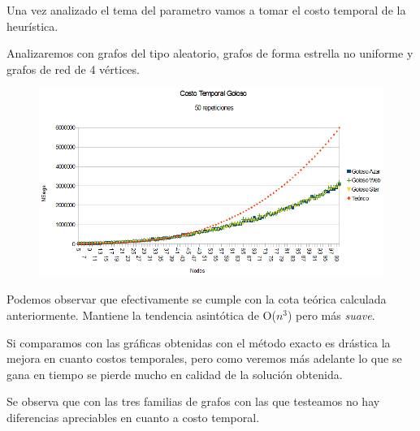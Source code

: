 \quad Una vez analizado el tema del parametro vamos a tomar el costo temporal de la heurística.

\quad Analizaremos con grafos del tipo aleatorio, grafos de forma estrella no uniforme y grafos de red de 4 vértices.

\begin{figure}[H]
	\centering
	\includegraphics[scale=0.6]{timingGoloso.png}
\end{figure}

\quad

\quad Podemos observar que efectivamente se cumple con la cota teórica calculada anteriormente. Mantiene la tendencia asintótica de O($ n^{3}$) pero más \textit{suave}. 

\quad Si comparamos con las gráficas obtenidas con el método exacto es drástica la mejora en cuanto costos temporales, pero como veremos más adelante lo que se gana en tiempo se pierde mucho en calidad de la solución obtenida.

\quad Se observa que con las tres familias de grafos con las que testeamos no hay diferencias apreciables en cuanto a costo temporal.